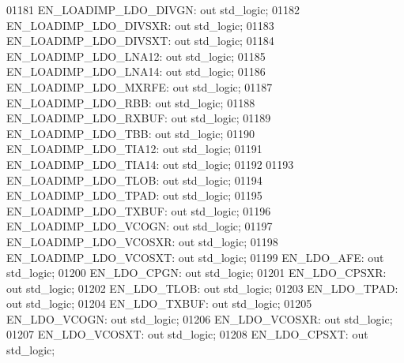 \begin{DoxyCode}
01181         EN\_LOADIMP\_LDO\_DIVGN:   \textcolor{keywordflow}{out} \textcolor{comment}{std\_logic};
01182         EN\_LOADIMP\_LDO\_DIVSXR:  \textcolor{keywordflow}{out} \textcolor{comment}{std\_logic};
01183         EN\_LOADIMP\_LDO\_DIVSXT:  \textcolor{keywordflow}{out} \textcolor{comment}{std\_logic};
01184         EN\_LOADIMP\_LDO\_LNA12:   \textcolor{keywordflow}{out} \textcolor{comment}{std\_logic};
01185         EN\_LOADIMP\_LDO\_LNA14:   \textcolor{keywordflow}{out} \textcolor{comment}{std\_logic};
01186         EN\_LOADIMP\_LDO\_MXRFE:   \textcolor{keywordflow}{out} \textcolor{comment}{std\_logic};
01187         EN\_LOADIMP\_LDO\_RBB: \textcolor{keywordflow}{out} \textcolor{comment}{std\_logic};
01188         EN\_LOADIMP\_LDO\_RXBUF:   \textcolor{keywordflow}{out} \textcolor{comment}{std\_logic};
01189         EN\_LOADIMP\_LDO\_TBB: \textcolor{keywordflow}{out} \textcolor{comment}{std\_logic};
01190         EN\_LOADIMP\_LDO\_TIA12:   \textcolor{keywordflow}{out} \textcolor{comment}{std\_logic};
01191         EN\_LOADIMP\_LDO\_TIA14:   \textcolor{keywordflow}{out} \textcolor{comment}{std\_logic};
01192 
01193         EN\_LOADIMP\_LDO\_TLOB:    \textcolor{keywordflow}{out} \textcolor{comment}{std\_logic};
01194         EN\_LOADIMP\_LDO\_TPAD:    \textcolor{keywordflow}{out} \textcolor{comment}{std\_logic};
01195         EN\_LOADIMP\_LDO\_TXBUF:   \textcolor{keywordflow}{out} \textcolor{comment}{std\_logic};
01196         EN\_LOADIMP\_LDO\_VCOGN:   \textcolor{keywordflow}{out} \textcolor{comment}{std\_logic};
01197         EN\_LOADIMP\_LDO\_VCOSXR:  \textcolor{keywordflow}{out} \textcolor{comment}{std\_logic};
01198         EN\_LOADIMP\_LDO\_VCOSXT:  \textcolor{keywordflow}{out} \textcolor{comment}{std\_logic};
01199         EN\_LDO\_AFE: \textcolor{keywordflow}{out} \textcolor{comment}{std\_logic};
01200         EN\_LDO\_CPGN:    \textcolor{keywordflow}{out} \textcolor{comment}{std\_logic};
01201         EN\_LDO\_CPSXR:   \textcolor{keywordflow}{out} \textcolor{comment}{std\_logic};
01202         EN\_LDO\_TLOB:    \textcolor{keywordflow}{out} \textcolor{comment}{std\_logic};
01203         EN\_LDO\_TPAD:    \textcolor{keywordflow}{out} \textcolor{comment}{std\_logic};
01204         EN\_LDO\_TXBUF:   \textcolor{keywordflow}{out} \textcolor{comment}{std\_logic};
01205         EN\_LDO\_VCOGN:   \textcolor{keywordflow}{out} \textcolor{comment}{std\_logic};
01206         EN\_LDO\_VCOSXR:  \textcolor{keywordflow}{out} \textcolor{comment}{std\_logic};
01207         EN\_LDO\_VCOSXT:  \textcolor{keywordflow}{out} \textcolor{comment}{std\_logic};
01208         EN\_LDO\_CPSXT:   \textcolor{keywordflow}{out} \textcolor{comment}{std\_logic};

\end{DoxyCode}
